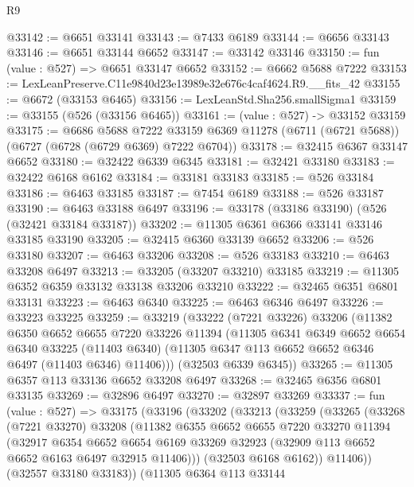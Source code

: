 \begin{lexlean}{R9}
\begin{coremodule}
@33142 := @6651 @33141
@33143 := @7433 @6189
@33144 := @6656 @33143
@33146 := @6651 @33144 @6652
@33147 := @33142 @33146
@33150 := fun (value : @527) => @6651 @33147 @6652
@33152 := @6662 @5688 @7222
@33153 := LexLeanPreserve.C11e9840d23e13989e32e676c4caf4624.R9.__fits_42
@33155 := @6672 (@33153 @6465)
@33156 := LexLeanStd.Sha256.smallSigma1
@33159 := @33155 (@526 (@33156 @6465))
@33161 := (value : @527) -> @33152 @33159
@33175 := @6686
    @5688
    @7222
    @33159
    @6369
    @11278
    (@6711 (@6721 @5688))
    (@6727 (@6728 (@6729 @6369) @7222 @6704))
@33178 := @32415 @6367 @33147 @6652
@33180 := @32422 @6339 @6345
@33181 := @32421 @33180
@33183 := @32422 @6168 @6162
@33184 := @33181 @33183
@33185 := @526 @33184
@33186 := @6463 @33185
@33187 := @7454 @6189
@33188 := @526 @33187
@33190 := @6463 @33188 @6497
@33196 := @33178 (@33186 @33190) (@526 (@32421 @33184 @33187))
@33202 := @11305 @6361 @6366 @33141 @33146 @33185 @33190
@33205 := @32415 @6360 @33139 @6652
@33206 := @526 @33180
@33207 := @6463 @33206
@33208 := @526 @33183
@33210 := @6463 @33208 @6497
@33213 := @33205 (@33207 @33210) @33185
@33219 := @11305 @6352 @6359 @33132 @33138 @33206 @33210
@33222 := @32465 @6351 @6801 @33131
@33223 := @6463 @6340
@33225 := @6463 @6346 @6497
@33226 := @33223 @33225
@33259 := @33219
    (@33222
      (@7221 @33226)
      @33206
      (@11382
        @6350
        @6652
        @6655
        @7220
        @33226
        @11394
        (@11305
          @6341
          @6349
          @6652
          @6654
          @6340
          @33225
          (@11403 @6340)
          (@11305 @6347 @113 @6652 @6652 @6346 @6497 (@11403 @6346) @11406)))
      (@32503 @6339 @6345))
@33265 := @11305 @6357 @113 @33136 @6652 @33208 @6497
@33268 := @32465 @6356 @6801 @33135
@33269 := @32896 @6497
@33270 := @32897 @33269
@33337 := fun (value : @527) =>
  @33175
    (@33196
      (@33202
        (@33213
          (@33259
            (@33265
              (@33268
                (@7221 @33270)
                @33208
                (@11382
                  @6355
                  @6652
                  @6655
                  @7220
                  @33270
                  @11394
                  (@32917
                    @6354
                    @6652
                    @6654
                    @6169
                    @33269
                    @32923
                    (@32909 @113 @6652 @6652 @6163 @6497 @32915 @11406)))
                (@32503 @6168 @6162))
              @11406))
          (@32557 @33180 @33183))
        (@11305
          @6364
          @113
          @33144

\end{coremodule}
\end{lexlean}
